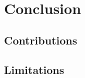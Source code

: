 \chapter{Conclusion}
\label{chap:conclusion}



\section{Contributions}
\label{sec:contributions}


\section{Limitations}
\label{sec:limitations}

